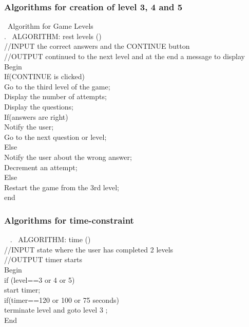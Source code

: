 \subsubsection{Algorithms for creation of level 3, 4 and 5 }

\ttfamily\ \hspace{1cm}Algorithm for Game Levels\\ 
\cite{DBLP:journals/ivc/KadyrovP03}.
\rmfamily\ ALGORITHM: rest levels ()\\
//INPUT the correct answers and the CONTINUE button\\
//OUTPUT continued to the next level and at the end a message to display\\
Begin\\
If(CONTINUE is clicked)\\
Go to the third level of the game;\\
Display the number of attempts;\\
Display the questions;\\
If(answers are right)\\
Notify the user;\\
Go to the next question or level;\\
Else\\
Notify the user about the wrong answer;\\
Decrement an attempt;\\
Else\\
Restart the game from the 3rd level;\\
end
\rmfamily

\subsubsection{Algorithms for time-constraint }

\ttfamily\ \hspace{1cm}
\cite{DBLP:journals/ivc/KadyrovP03}.
\rmfamily\ ALGORITHM: time () \\

//INPUT  state where the user has completed 2 levels\\
//OUTPUT timer starts\\

Begin\\
 if (level==3 or 4 or 5)\\
start timer;\\
if(timer==120 or 100 or 75 seconds)\\
terminate level and goto level 3 ;\\
End
\rmfamily
